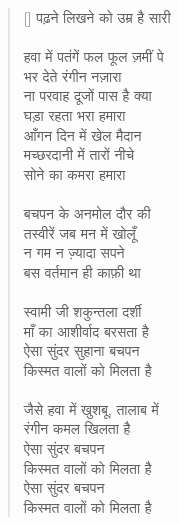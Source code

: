 \begin{verse}[\versewidth]
{पढ़ने लिखने को उम्र है सारी\\
\\
हवा में पतंगें फल फूल ज़मीं पे\\
भर देते रंगीन नज़ारा\\
ना परवाह दूजों पास है क्या\\
घड़ा रहता भरा हमारा\\
आँगन दिन में खेल मैदान\\
मच्छरदानी में तारों नीचे\\
सोने का कमरा हमारा\\
\\
बचपन के अनमोल दौर की\\
तस्वीरें जब मन में खोलूँ\\
न गम न ज़्यादा सपने\\
बस वर्तमान ही काफ़ी था\\
\\
स्वामी जी शकुन्तला दर्शी\\
माँ का आशीर्वाद बरसता है\\
ऐसा सुंदर सुहाना बचपन\\
किस्मत वालों को मिलता है\\
\\
जैसे हवा में खुशबू, तालाब में\\
रंगीन कमल खिलता है\\
ऐसा सुंदर बचपन\\
किस्मत वालों को मिलता है\\
ऐसा सुंदर बचपन\\
किस्मत वालों को मिलता है
}
\end{verse}

